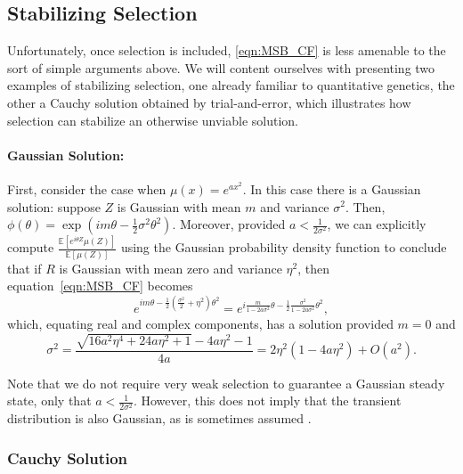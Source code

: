 \documentclass{article}
\newcommand{\1}{\mathbbm{1}}
\theoremstyle{remark}
\theoremstyle{definition}
\begin{document}
\subsection{Stabilizing Selection}
    \label{sec:stabilizing_selection}
    
Unfortunately, once selection is included, \eqref{eqn:MSB_CF} is less amenable to the sort of simple arguments above.  We will content ourselves with presenting two examples of stabilizing selection, one already familiar to quantitative genetics, the other a Cauchy solution obtained by trial-and-error, which illustrates how selection can stabilize an otherwise unviable solution.

\paragraph{Gaussian Solution:}
First, consider the case when $\mu(x) = e^{a x^{2}}$.   In this case there is a Gaussian solution: suppose $Z$ is Gaussian with mean $m$ and variance $\sigma^{2}$.  Then,
$ \phi(\theta) = \exp(i m \theta - \frac{1}{2} \sigma^{2} \theta^{2}).  $
Moreover, provided $a < \frac{1}{2\sigma^{2}}$, we can explicitly compute $\frac{\mathbb{E}\left[e^{i \theta Z}\mu(Z)\right]}{\mathbb{E}[\mu(Z)]}$  using the Gaussian probability density function to conclude that
if $R$ is Gaussian with mean zero and variance $\eta^2$, then equation~\eqref{eqn:MSB_CF} becomes
\[
	e^{i m \theta - \frac{1}{2} \left(\frac{\sigma^{2}}{2} + \eta^{2}\right)\theta^{2}}
	= e^{i \frac{m}{1-2 a \sigma^{2}}\theta 
		- \frac{1}{2} \frac{\sigma^{2}}{1-2 a \sigma^{2}}\theta^{2}},
\]
which, equating real and complex components, has a solution provided $m = 0$ and
\[
	\sigma^{2} = \frac{\sqrt{16 a^{2} \eta^{4} + 24 a \eta^{2}+1} - 4a \eta^{2} -1}{4a} 
	=  2\eta^{2}(1-4a\eta^{2}) + O(a^{2}).
\]

Note that we do not require very weak selection to guarantee a Gaussian steady state, only that $a < \frac{1}{2\sigma^{2}}$.  However, this does not imply that the transient distribution is also Gaussian, as is sometimes assumed \citep[e.g.,][]{lande1976natural}. %


\subsubsection{Cauchy Solution}
    \label{sec:stabilizing_cauchy}
\end{document}
